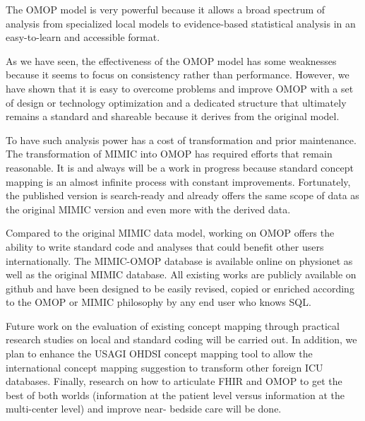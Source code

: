 The OMOP model is very powerful because it allows a broad spectrum of analysis 
from specialized local models to evidence-based statistical analysis in an 
easy-to-learn and accessible format.

As we have seen, the effectiveness of the OMOP model has some weaknesses because 
it seems to focus on consistency rather than performance. However, we have shown 
that it is easy to overcome problems and improve OMOP with a set of design or 
technology optimization and a dedicated structure that ultimately remains a 
standard and shareable because it derives from the original model.

To have such analysis power has a cost of transformation and prior maintenance. 
The transformation of MIMIC into OMOP has required efforts that remain reasonable. 
It is and always will be a work in progress because standard concept mapping is 
an almost infinite process with constant improvements. Fortunately, the published 
version is search-ready and already offers the same scope of data as the original 
MIMIC version and even more with the derived data.


Compared to the original MIMIC data model, working on OMOP offers the ability to 
write standard code and analyses that could benefit other users internationally. 
The MIMIC-OMOP database is available online on physionet as well as the original 
MIMIC database. All existing works are publicly available on github 
\cite{mimic-omop-github} and have been designed to be easily revised, copied or 
enriched according to the OMOP or MIMIC philosophy by any end user who knows SQL.



Future work on the evaluation of existing concept mapping through practical 
research studies on local and standard coding will be carried out. In addition, 
we plan to enhance the USAGI OHDSI concept mapping tool to allow the international 
concept mapping suggestion to transform other foreign ICU databases. Finally, 
research on how to articulate FHIR and OMOP to get the best of both worlds 
(information at the patient level versus information at the multi-center level) 
and improve near- bedside care will be done.
